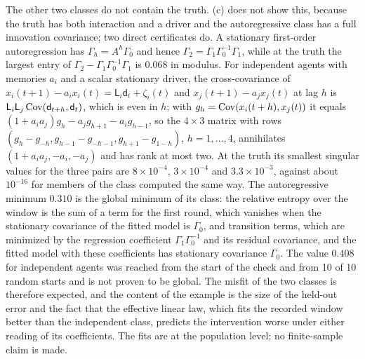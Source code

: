 \begin{remark}
The other two classes do not contain the truth. (c) does not show this, because the truth has both interaction and a driver and the autoregressive class has a full innovation covariance; two direct certificates do. A stationary first-order autoregression has $\Gamma_h=A^h\Gamma_0$ and hence $\Gamma_2=\Gamma_1\Gamma_0^{-1}\Gamma_1$, while at the truth the largest entry of $\Gamma_2-\Gamma_1\Gamma_0^{-1}\Gamma_1$ is $0.068$ in modulus. For independent agents with memories $a_i$ and a scalar stationary driver, the cross-covariance of $x_i(t+1)-a_ix_i(t)=\mathsf L_i\mathsf d_t+\zeta_i(t)$ and $x_j(t+1)-a_jx_j(t)$ at lag $h$ is $\mathsf L_i\mathsf L_j\operatorname{Cov}(\mathsf d_{t+h},\mathsf d_t)$, which is even in $h$; with $g_h=\operatorname{Cov}(x_i(t+h),x_j(t))$ it equals $(1+a_ia_j)g_h-a_jg_{h+1}-a_ig_{h-1}$, so the $4\times3$ matrix with rows $(g_h-g_{-h},g_{h-1}-g_{-h-1},g_{h+1}-g_{1-h})$, $h=1,\dots,4$, annihilates $(1+a_ia_j,-a_i,-a_j)$ and has rank at most two. At the truth its smallest singular values for the three pairs are $8\times10^{-4}$, $3\times10^{-4}$ and $3.3\times10^{-3}$, against about $10^{-16}$ for members of the class computed the same way. The autoregressive minimum $0.310$ is the global minimum of its class: the relative entropy over the window is the sum of a term for the first round, which vanishes when the stationary covariance of the fitted model is $\Gamma_0$, and transition terms, which are minimized by the regression coefficient $\Gamma_1\Gamma_0^{-1}$ and its residual covariance, and the fitted model with these coefficients has stationary covariance $\Gamma_0$. The value $0.408$ for independent agents was reached from the start of the check and from 10 of 10 random starts and is not proven to be global. The misfit of the two classes is therefore expected, and the content of the example is the size of the held-out error and the fact that the effective linear law, which fits the recorded window better than the independent class, predicts the intervention worse under either reading of its coefficients. The fits are at the population level; no finite-sample claim is made.
\end{remark}
